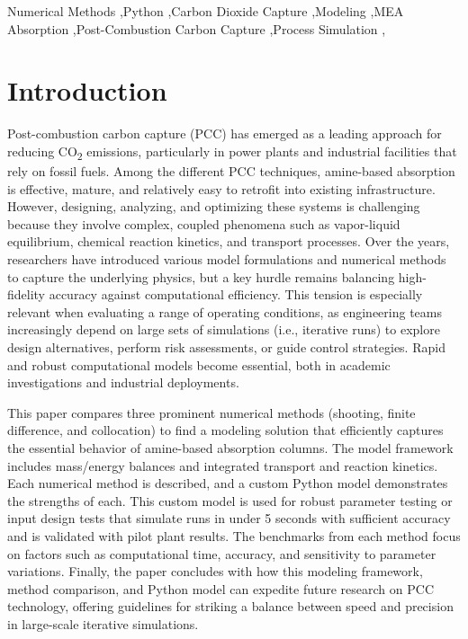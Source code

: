 \documentclass[a4paper,fleqn]{cas-sc}
\begin{document}
    \begin{keywords}
        Numerical Methods \sep Python \sep Carbon Dioxide Capture \sep Modeling \sep MEA Absorption \sep Post-Combustion Carbon Capture \sep Process Simulation \sep
    \end{keywords}

    \maketitle

    \section{Introduction}\label{sec:introduction}
    Post-combustion carbon capture (PCC) has emerged as a leading approach for reducing CO\textsubscript{2} emissions, particularly in power plants and industrial facilities that rely on fossil fuels. Among the different PCC techniques, amine-based absorption is effective, mature, and relatively easy to retrofit into existing infrastructure. However, designing, analyzing, and optimizing these systems is challenging because they involve complex, coupled phenomena such as vapor-liquid equilibrium, chemical reaction kinetics, and transport processes. Over the years, researchers have introduced various model formulations and numerical methods to capture the underlying physics, but a key hurdle remains balancing high-fidelity accuracy against computational efficiency. This tension is especially relevant when evaluating a range of operating conditions, as engineering teams increasingly depend on large sets of simulations (i.e., iterative runs) to explore design alternatives, perform risk assessments, or guide control strategies. Rapid and robust computational models become essential, both in academic investigations and industrial deployments.

    This paper compares three prominent numerical methods (shooting, finite difference, and collocation) to find a modeling solution that efficiently captures the essential behavior of amine-based absorption columns. The model framework includes mass/energy balances and integrated transport and reaction kinetics. Each numerical method is described, and a custom Python model demonstrates the strengths of each.  This custom model is used for robust parameter testing or input design tests that simulate runs in under 5 seconds with sufficient accuracy and is validated with pilot plant results. The benchmarks from each method focus on factors such as computational time, accuracy, and sensitivity to parameter variations. Finally, the paper concludes with how this modeling framework, method comparison, and Python model can expedite future research on PCC technology, offering guidelines for striking a balance between speed and precision in large-scale iterative simulations.
\end{document}
